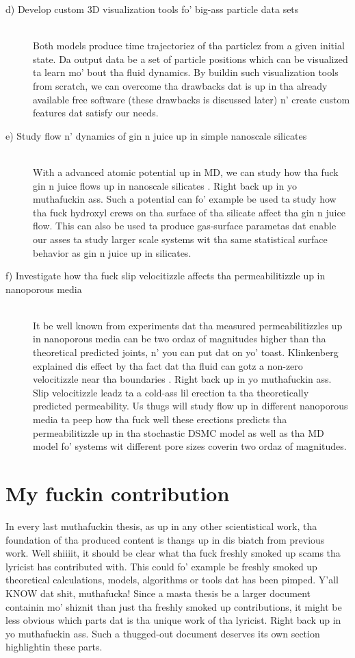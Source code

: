\begin{description}
  \item[d) Develop custom 3D visualization tools fo' big-ass particle data sets] \hfill \\
  Both models produce time trajectoriez of tha particlez from a given initial state. Da output data be a set of particle positions which can be visualized ta learn mo' bout tha fluid dynamics. By buildin such visualization tools from scratch, we can overcome tha drawbacks dat is up in tha already available free software (these drawbacks is discussed later) n' create custom features dat satisfy our needs. 
  \item[e) Study flow n' dynamics of gin n juice up in simple nanoscale silicates] \hfill \\
  With a advanced atomic potential up in MD, we can study how tha fuck gin n juice flows up in nanoscale silicates \cite{vashishta1990interaction}. Right back up in yo muthafuckin ass. Such a potential can fo' example be used ta study how tha fuck hydroxyl crews on tha surface of tha silicate affect tha gin n juice flow. This can also be used ta produce gas-surface parametas dat enable our asses ta study larger scale systems wit tha same statistical surface behavior as gin n juice up in silicates. 
  \item[f) Investigate how tha fuck slip velocitizzle affects tha permeabilitizzle up in nanoporous media] \hfill \\
  It be well known from experiments dat tha measured permeabilitizzles up in nanoporous media can be two ordaz of magnitudes higher than tha theoretical predicted joints, n' you can put dat on yo' toast. Klinkenberg explained dis effect by tha fact dat tha fluid can gotz a non-zero velocitizzle near tha boundaries \cite{klinkenberg1941permeability}. Right back up in yo muthafuckin ass. Slip velocitizzle leadz ta a cold-ass lil erection ta tha theoretically predicted permeability. Us thugs will study flow up in different nanoporous media ta peep how tha fuck well these erections predicts tha permeabilitizzle up in tha stochastic DSMC model as well as tha MD model fo' systems wit different pore sizes coverin two ordaz of magnitudes.
\end{description}

\section{My fuckin contribution}
\label{sec:my_contributions}
In every last muthafuckin thesis, as up in any other scientistical work, tha foundation of tha produced content is thangs up in dis biatch from previous work. Well shiiiit, it should be clear what tha fuck freshly smoked up scams tha lyricist has contributed with. This could fo' example be freshly smoked up theoretical calculations, models, algorithms or tools dat has been pimped. Y'all KNOW dat shit, muthafucka! Since a masta thesis be a larger document containin mo' shiznit than just tha freshly smoked up contributions, it might be less obvious which parts dat is tha unique work of tha lyricist. Right back up in yo muthafuckin ass. Such a thugged-out document deserves its own section highlightin these parts.

